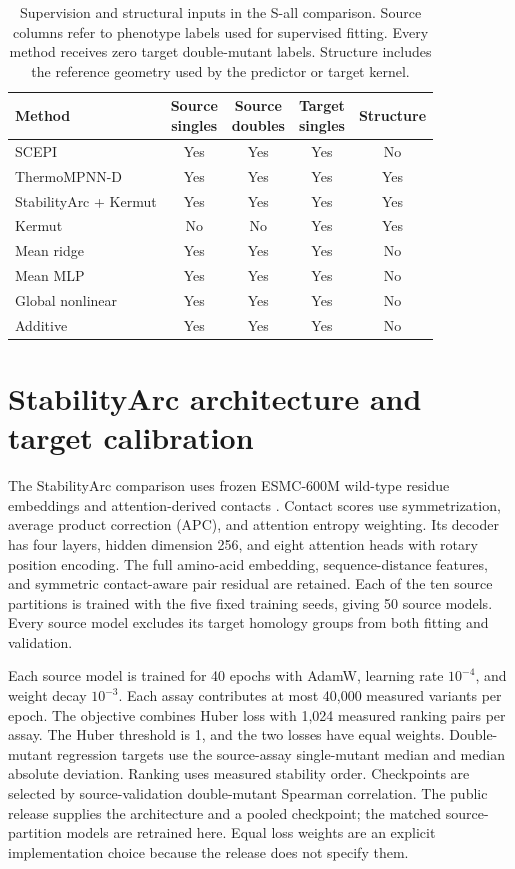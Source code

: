 \documentclass{llncs}
\begin{document}
\begin{table}[H]
\centering
\caption{Supervision and structural inputs in the S-all comparison. Source columns refer to phenotype labels used for supervised fitting. Every method receives zero target double-mutant labels. Structure includes the reference geometry used by the predictor or target kernel.}
\label{tab:permissions}
\begin{tabular}{lcccc}
\toprule
Method & \shortstack{Source\\singles} & \shortstack{Source\\doubles} & \shortstack{Target\\singles} & Structure \\
\midrule
SCEPI & Yes & Yes & Yes & No \\
ThermoMPNN-D & Yes & Yes & Yes & Yes \\
StabilityArc + Kermut & Yes & Yes & Yes & Yes \\
Kermut & No & No & Yes & Yes \\
Mean ridge & Yes & Yes & Yes & No \\
Mean MLP & Yes & Yes & Yes & No \\
Global nonlinear & Yes & Yes & Yes & No \\
Additive & Yes & Yes & Yes & No \\
\bottomrule
\end{tabular}
\end{table}

\section{StabilityArc architecture and target calibration}
\label{app:stabilityarc}

The StabilityArc comparison uses frozen ESMC-600M wild-type residue embeddings and attention-derived contacts \citep{feller2026}. Contact scores use symmetrization, average product correction (APC), and attention entropy weighting. Its decoder has four layers, hidden dimension 256, and eight attention heads with rotary position encoding. The full amino-acid embedding, sequence-distance features, and symmetric contact-aware pair residual are retained. Each of the ten source partitions is trained with the five fixed training seeds, giving 50 source models. Every source model excludes its target homology groups from both fitting and validation.

Each source model is trained for 40 epochs with AdamW, learning rate $10^{-4}$, and weight decay $10^{-3}$. Each assay contributes at most 40,000 measured variants per epoch. The objective combines Huber loss with 1,024 measured ranking pairs per assay. The Huber threshold is 1, and the two losses have equal weights. Double-mutant regression targets use the source-assay single-mutant median and median absolute deviation. Ranking uses measured stability order. Checkpoints are selected by source-validation double-mutant Spearman correlation. The public release supplies the architecture and a pooled checkpoint; the matched source-partition models are retrained here. Equal loss weights are an explicit implementation choice because the release does not specify them.
\end{document}
